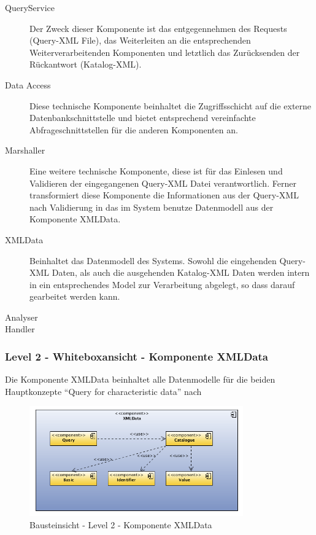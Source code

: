 \begin{description}
\item[QueryService] Der Zweck dieser Komponente ist das entgegennehmen des Requests (Query-XML File), das Weiterleiten an die entsprechenden Weiterverarbeitenden Komponenten und letztlich das Zurücksenden der Rückantwort (Katalog-XML).
\item[Data Access] Diese technische Komponente beinhaltet die Zugriffsschicht auf die externe Datenbankschnittstelle und bietet entsprechend vereinfachte Abfrageschnittstellen für die anderen Komponenten an. 
\item[Marshaller] Eine weitere technische Komponente, diese ist für das Einlesen und Validieren der eingegangenen Query-XML Datei verantwortlich. Ferner transformiert diese Komponente die Informationen aus der Query-XML nach Validierung in das im System benutze Datenmodell aus der Komponente XMLData.
\item[XMLData] Beinhaltet das Datenmodell des Systems. Sowohl die eingehenden Query-XML Daten, als auch die ausgehenden Katalog-XML Daten werden intern in ein entsprechendes Model zur Verarbeitung abgelegt, so dass darauf gearbeitet werden kann.  
\item[Analyser] 
\item[Handler] 
\end{description}

\subsubsection{Level 2 - Whiteboxansicht - Komponente XMLData} 

Die Komponente XMLData beinhaltet alle Datenmodelle für die beiden Hauptkonzepte \enquote{Query for characteristic data} nach 

\begin{figure}[htbp]
	\centering
		\includegraphics[width=0.82\textwidth]{images/bausteinsicht_plib_level2_xmldata.png}
	\caption{Bausteinsicht - Level 2 - Komponente XMLData}
	\label{fig:bausteinsicht_level2_xmldata}
\end{figure}


